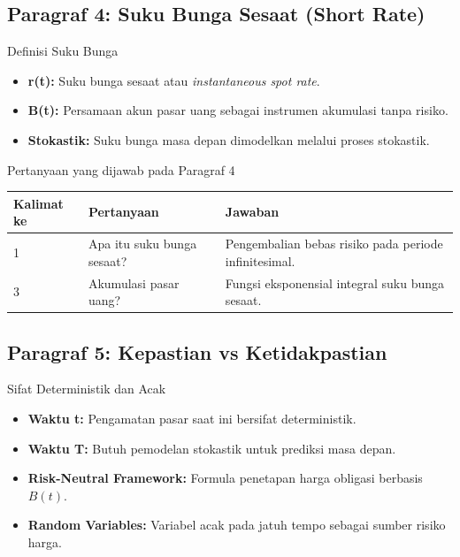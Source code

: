 \subsection{Paragraf 4: Suku Bunga Sesaat (Short Rate)}
\begin{frame}{Definisi Suku Bunga}
    \begin{itemize}
        \item \textbf{r(t):} Suku bunga sesaat atau \textit{instantaneous spot rate}.
        \item \textbf{B(t):} Persamaan akun pasar uang sebagai instrumen akumulasi tanpa risiko.
        \item \textbf{Stokastik:} Suku bunga masa depan dimodelkan melalui proses stokastik.
    \end{itemize}
\end{frame}

\begin{frame}{Pertanyaan yang dijawab pada Paragraf 4}
    \centering
    \small
    \begin{tabular}{lp{4.5cm}p{6cm}}
        \toprule
        Kalimat ke & Pertanyaan & Jawaban \\
        \midrule
        1 & Apa itu suku bunga sesaat? & Pengembalian bebas risiko pada periode infinitesimal. \\
        3 & Akumulasi pasar uang? & Fungsi eksponensial integral suku bunga sesaat. \\
        \bottomrule
    \end{tabular}
\end{frame}

\subsection{Paragraf 5: Kepastian vs Ketidakpastian}
\begin{frame}{Sifat Deterministik dan Acak}
    \begin{itemize}
        \item \textbf{Waktu t:} Pengamatan pasar saat ini bersifat deterministik.
        \item \textbf{Waktu T:} Butuh pemodelan stokastik untuk prediksi masa depan.
        \item \textbf{Risk-Neutral Framework:} Formula penetapan harga obligasi berbasis $B(t)$.
        \item \textbf{Random Variables:} Variabel acak pada jatuh tempo sebagai sumber risiko harga.
    \end{itemize}
\end{frame}

